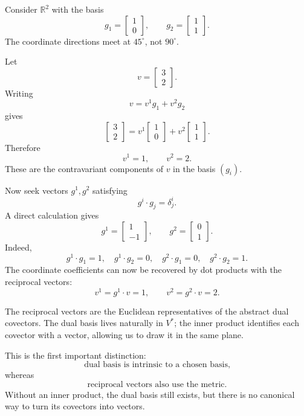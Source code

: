 Consider \(\mathbb R^2\) with the basis
\[
  g_1=
  \begin{bmatrix}1\\0\end{bmatrix},
  \qquad
  g_2=
  \begin{bmatrix}1\\1\end{bmatrix}.
\]
The coordinate directions meet at \(45^\circ\), not \(90^\circ\).

Let
\[
  v=
  \begin{bmatrix}3\\2\end{bmatrix}.
\]
Writing
\[
  v=v^1g_1+v^2g_2
\]
gives
\[
  \begin{bmatrix}3\\2\end{bmatrix}
  =v^1
  \begin{bmatrix}1\\0\end{bmatrix}
  +v^2
  \begin{bmatrix}1\\1\end{bmatrix}.
\]
Therefore
\[
  v^1=1,
  \qquad
  v^2=2.
\]
These are the contravariant components of \(v\) in the basis \((g_i)\).

Now seek vectors \(g^1,g^2\) satisfying
\[
  g^i\cdot g_j=\delta^i_j.
\]
A direct calculation gives
\[
  g^1=
  \begin{bmatrix}1\\-1\end{bmatrix},
  \qquad
  g^2=
  \begin{bmatrix}0\\1\end{bmatrix}.
\]
Indeed,
\[
  g^1\cdot g_1=1,
  \quad
  g^1\cdot g_2=0,
  \quad
  g^2\cdot g_1=0,
  \quad
  g^2\cdot g_2=1.
\]
The coordinate coefficients can now be recovered by dot products with the reciprocal vectors:
\[
  v^1=g^1\cdot v=1,
  \qquad
  v^2=g^2\cdot v=2.
\]

The reciprocal vectors are the Euclidean representatives of the abstract dual covectors.  The dual basis lives naturally in \(V^*\); the inner product identifies each covector with a vector, allowing us to draw it in the same plane.

This is the first important distinction:
\[
  \text{dual basis is intrinsic to a chosen basis,}
\]
whereas
\[
  \text{reciprocal vectors also use the metric.}
\]
Without an inner product, the dual basis still exists, but there is no canonical way to turn its covectors into vectors.

